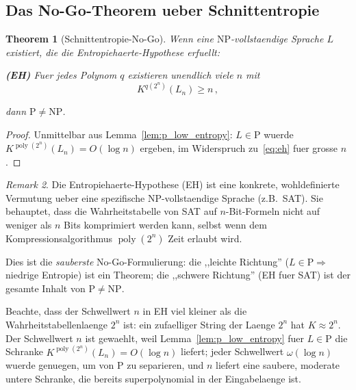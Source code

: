 \documentclass[aps,prd,twocolumn,superscriptaddress,nofootinbib]{revtex4-2}
\newtheorem{theorem}{Theorem}[section]
\theoremstyle{definition}
\theoremstyle{remark}
\newtheorem{remark}[theorem]{Remark}
\DeclareMathOperator{\poly}{poly}
\newcommand{\NP}{\mathrm{NP}}
\newcommand{\PP}{\mathrm{P}}
\begin{document}
\subsection{Das No-Go-Theorem ueber Schnittentropie}

\begin{theorem}[Schnittentropie-No-Go]
\label{thm:slice_nogo}
Wenn eine $\NP$-vollstaendige Sprache $L$ existiert, die die \textit{Entropiehaerte-Hypothese} erfuellt:

\textbf{(EH)} Fuer jedes Polynom $q$ existieren unendlich viele $n$ mit
\begin{equation}
K^{q(2^n)}(L_n) \geq n\,,
\label{eq:eh}
\end{equation}

dann $\PP \neq \NP$.
\end{theorem}

\begin{proof}
Unmittelbar aus Lemma~\ref{lem:p_low_entropy}: $L \in \PP$ wuerde $K^{\poly(2^n)}(L_n) = O(\log n)$ ergeben, im Widerspruch zu~\eqref{eq:eh} fuer grosse $n$.
\end{proof}

\begin{remark}
Die Entropiehaerte-Hypothese (EH) ist eine konkrete, wohldefinierte Vermutung ueber eine spezifische NP-vollstaendige Sprache (z.B.\ SAT). Sie behauptet, dass die Wahrheitstabelle von SAT auf $n$-Bit-Formeln nicht auf weniger als $n$ Bits komprimiert werden kann, selbst wenn dem Kompressionsalgorithmus $\poly(2^n)$ Zeit erlaubt wird.

Dies ist die \textit{sauberste} No-Go-Formulierung: die ,,leichte Richtung'' ($L \in \PP \Rightarrow$ niedrige Entropie) ist ein Theorem; die ,,schwere Richtung'' (EH fuer SAT) ist der gesamte Inhalt von $\PP \neq \NP$.

Beachte, dass der Schwellwert $n$ in EH viel kleiner als die Wahrheitstabellenlaenge $2^n$ ist: ein zufaelliger String der Laenge $2^n$ hat $K \approx 2^n$. Der Schwellwert $n$ ist gewaehlt, weil Lemma~\ref{lem:p_low_entropy} fuer $L \in \PP$ die Schranke $K^{\poly(2^n)}(L_n) = O(\log n)$ liefert; jeder Schwellwert $\omega(\log n)$ wuerde genuegen, um von P zu separieren, und $n$ liefert eine saubere, moderate untere Schranke, die bereits superpolynomial in der Eingabelaenge ist.
\end{remark}
\end{document}
